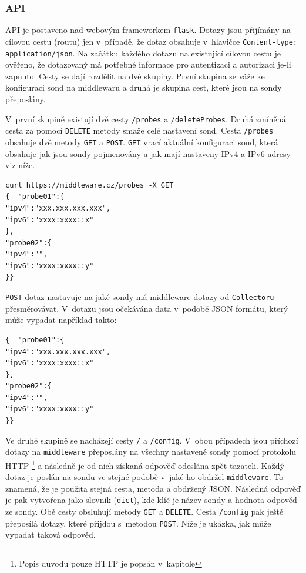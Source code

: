 \documentclass[thesis=M,czech]{src/FITthesis}[2019/12/23]
\begin{document}
\subsubsection{API}
API je postaveno nad webovým frameworkem \texttt{flask}. Dotazy jsou přijímány na cílovou cestu (routu) jen v~případě, že dotaz obsahuje v~hlavičce \texttt{Content-type: application/json}. Na začátku každého dotazu na existující cílovou cestu je ověřeno, že dotazovaný má potřebné informace pro autentizaci a autorizaci je-li zapnuto. Cesty se dají rozdělit na dvě skupiny. První skupina se váže ke konfiguraci sond na middlewaru a druhá je skupina cest, které jsou na sondy přeposlány.

V~první skupině existují dvě cesty \texttt{/probes} a \texttt{/deleteProbes}. Druhá zmíněná cesta za pomocí \texttt{DELETE} metody smaže celé nastavení sond. Cesta \texttt{/probes} obsahuje dvě metody \texttt{GET} a \texttt{POST}. \texttt{GET} vrací aktuální konfiguraci sond, která obsahuje jak jsou sondy pojmenovány a jak mají nastaveny IPv4 a IPv6 adresy viz níže.  
\begin{verbatim}
curl https://middleware.cz/probes -X GET
{  "probe01":{
"ipv4":"xxx.xxx.xxx.xxx",
"ipv6":"xxxx:xxxx::x"
},
"probe02":{
"ipv4":"",
"ipv6":"xxxx:xxxx::y"
}}
\end{verbatim}

\texttt{POST} dotaz nastavuje na jaké sondy má middleware dotazy od \texttt{Collectoru} přesměrovávat. V~dotazu jsou očekávána data v~podobě JSON formátu, který může vypadat například takto:
\begin{verbatim}
{  "probe01":{
"ipv4":"xxx.xxx.xxx.xxx",
"ipv6":"xxxx:xxxx::x"
},
"probe02":{
"ipv4":"",
"ipv6":"xxxx:xxxx::y"
}}
\end{verbatim}

Ve druhé skupině se nacházejí cesty \texttt{/} a \texttt{/config}. V~obou případech jsou příchozí dotazy na \texttt{middleware} přeposlány na všechny nastavené sondy pomocí protokolu HTTP \footnote{Popis důvodu pouze HTTP je popsán v~kapitole } a následně je od nich získaná odpověď odeslána zpět tazateli. Každý dotaz je poslán na sondu ve stejné podobě v~jaké ho obdržel \texttt{middleware}. To znamená, že je použita stejná cesta, metoda a obdržený JSON. Následná odpověď je pak vytvořena jako slovník (\texttt{dict}), kde klíč je název sondy a hodnota odpověď ze sondy. Obě cesty obsluhují metody \texttt{GET} a \texttt{DELETE}. Cesta \texttt{/config} pak ještě přeposílá dotazy, které přijdou s~metodou \texttt{POST}. Níže je ukázka, jak může vypadat taková odpověď. 
\end{document}
